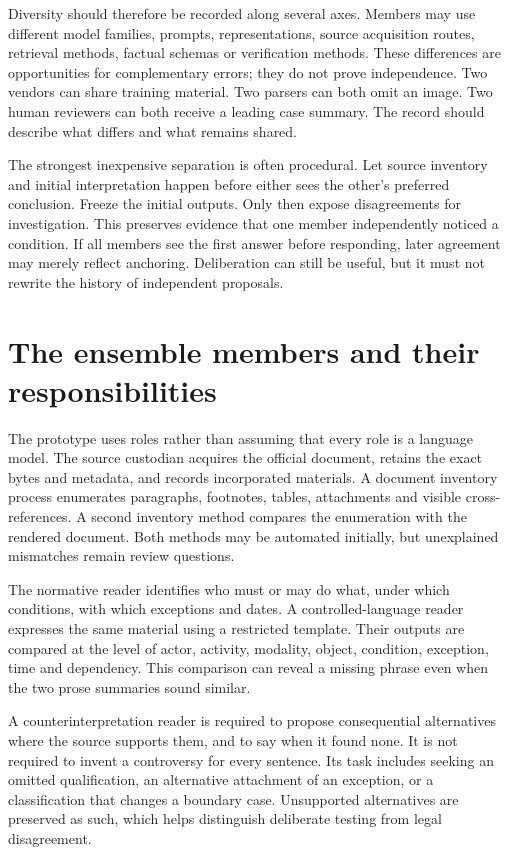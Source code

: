 Diversity should therefore be recorded along several axes. Members may use
different model families, prompts, representations, source acquisition routes,
retrieval methods, factual schemas or verification methods. These differences are
opportunities for complementary errors; they do not prove independence. Two
vendors can share training material. Two parsers can both omit an image. Two human
reviewers can both receive a leading case summary. The record should describe
what differs and what remains shared.

The strongest inexpensive separation is often procedural. Let source inventory
and initial interpretation happen before either sees the other's preferred
conclusion. Freeze the initial outputs. Only then expose disagreements for
investigation. This preserves evidence that one member independently noticed a
condition. If all members see the first answer before responding, later agreement
may merely reflect anchoring. Deliberation can still be useful, but it must not
rewrite the history of independent proposals.

\section{The ensemble members and their responsibilities}

The prototype uses roles rather than assuming that every role is a language
model. The source custodian acquires the official document, retains the exact
bytes and metadata, and records incorporated materials. A document inventory
process enumerates paragraphs, footnotes, tables, attachments and visible
cross-references. A second inventory method compares the enumeration with the
rendered document. Both methods may be automated initially, but unexplained
mismatches remain review questions.

The normative reader identifies who must or may do what, under which conditions,
with which exceptions and dates. A controlled-language reader expresses the same
material using a restricted template. Their outputs are compared at the level
of actor, activity, modality, object, condition, exception, time and dependency.
This comparison can reveal a missing phrase even when the two prose summaries
sound similar.

A counterinterpretation reader is required to propose consequential alternatives
where the source supports them, and to say when it found none. It is not required
to invent a controversy for every sentence. Its task includes seeking an omitted
qualification, an alternative attachment of an exception, or a classification
that changes a boundary case. Unsupported alternatives are preserved as such,
which helps distinguish deliberate testing from legal disagreement.

